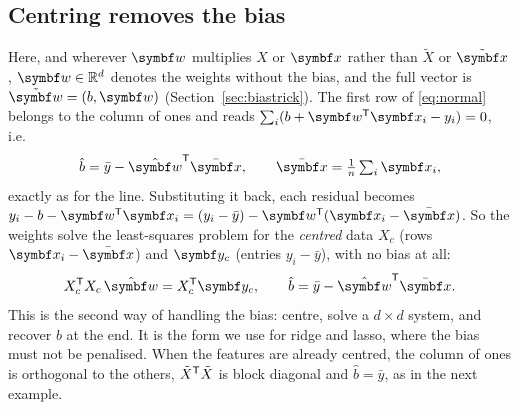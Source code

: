 \documentclass[11pt]{article}
\newcommand{\Xt}{\tilde X}
\newcommand{\xt}{\tilde{\x}}
\newcommand{\w}{\vect{w}}
\newcommand{\y}{\vect{y}}
\begin{document}
\subsection{Centring removes the bias}\label{sec:centring}

Here, and wherever $\w$ multiplies $X$ or $\x$ rather than $\Xt$ or $\xt$, $\w \in \R^d$ denotes the weights without
the bias, and the full vector is $\tilde{\w} = (b, \w)$ (Section~\ref{sec:biastrick}). The first row of \eqref{eq:normal} belongs to the column of ones and reads
$\sum_i (b + \w\T\x_i - y_i) = 0$, i.e.
\[
  \hat b = \bar y - \hat{\w}\T\bar{\x}, \qquad \bar{\x} = \tfrac1n \textstyle\sum_i \x_i ,
\]
exactly as for the line. Substituting it back, each residual becomes $y_i - b - \w\T\x_i = (y_i - \bar y) -
\w\T(\x_i - \bar{\x})$. So the weights solve the least-squares problem for the \emph{centred} data $X_c$ (rows
$\x_i - \bar{\x}$) and $\y_c$ (entries $y_i - \bar y$), with no bias at all:
\[
  X_c\T X_c\, \hat{\w} = X_c\T \y_c, \qquad \hat b = \bar y - \hat{\w}\T\bar{\x} .
\]
This is the second way of handling the bias: centre, solve a $d \times d$ system, and recover $b$ at the end. It is the
form we use for ridge and lasso, where the bias must not be penalised. When the features are already centred, the
column of ones is orthogonal to the others, $\Xt\T\Xt$ is block diagonal and $\hat b = \bar y$, as in the next example.
\end{document}
